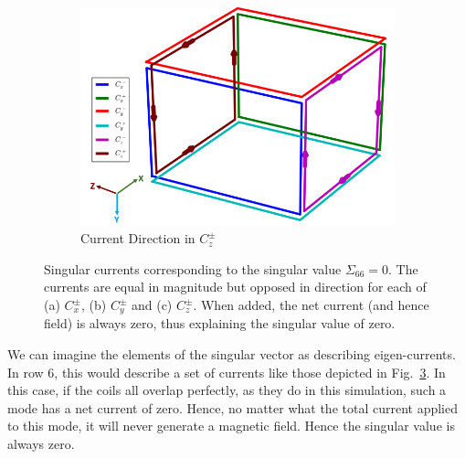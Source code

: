 \begin{figure}
\begin{subfigure}{.5\linewidth}
        \label{fig:c3}
    \end{subfigure}\\[1ex]
    \begin{subfigure}{\linewidth}
        \centering
        \includegraphics[scale=.33]{Images/c5_4}
        \caption{Current Direction in $C_z^{\pm}$}
        \label{fig:c5}
    \end{subfigure}

\caption[Singular currents corresponding to the singular value $\Sigma_{66}=0$]{Singular currents corresponding to the singular value $\Sigma_{66}=0$.  The currents are equal in magnitude but opposed in direction for each of (a) $C_x^{\pm}$, (b) $C_y^{\pm}$ and (c) $C_z^{\pm}$. When added, the net current (and hence field) is always zero, thus explaining the singular value of zero.}
    \label{fig:cDir}
\end{figure}

We can imagine the elements of the singular vector as describing
eigen-currents.  In row 6, this would describe a set of currents like
those depicted in Fig.~\ref{fig:cDir}.  In this case, if the coils all
overlap perfectly, as they do in this simulation, such a mode has a
net current of zero.  Hence, no matter what the total current applied
to this mode, it will never generate a magnetic field.  Hence the
singular value is always zero.



